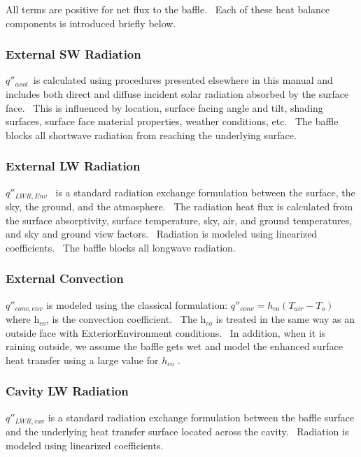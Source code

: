 All terms are positive for net flux to the baffle.~ Each of these heat balance components is introduced briefly below.

\subsubsection{External SW Radiation}\label{external-sw-radiation}

\(q''_{\alpha sol}\)~is calculated using procedures presented elsewhere in this manual and includes both direct and diffuse incident solar radiation absorbed by the surface face.~ This is influenced by location, surface facing angle and tilt, shading surfaces, surface face material properties, weather conditions, etc.~ The baffle blocks all shortwave radiation from reaching the underlying surface.

\subsubsection{External LW Radiation}\label{external-lw-radiation}

\({q''_{LWR,Env}}\) ~is a standard radiation exchange formulation between the surface, the sky, the ground, and the atmosphere.~ The radiation heat flux is calculated from the surface absorptivity, surface temperature, sky, air, and ground temperatures, and sky and ground view factors.~ Radiation is modeled using linearized coefficients. ~The baffle blocks all longwave radiation.

\subsubsection{External Convection}\label{external-convection}

\(q''_{conv,env}\) is modeled using the classical formulation: \(q''_{conv} = h_{co}(T_{air} - T_{o})\) where h\(_{co}\), is the convection coefficient.~ The h\(_{co}\) is treated in the same way as an outside face with ExteriorEnvironment conditions.~ In addition, when it is raining outside, we assume the baffle gets wet and model the enhanced surface heat transfer using a large value for \({h_{co}}\) .

\subsubsection{Cavity LW Radiation}\label{cavity-lw-radiation}

\({q''_{LWR,cav}}\) is a standard radiation exchange formulation between the baffle surface and the underlying heat transfer surface located across the cavity.~ Radiation is modeled using linearized coefficients.

